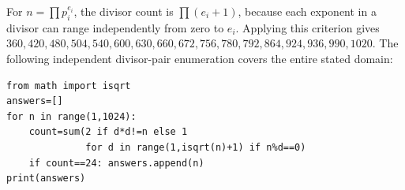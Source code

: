 For $n=\prod p_i^{e_i}$, the divisor count is $\prod(e_i+1)$, because each exponent in a divisor can range independently from zero to $e_i$. Applying this criterion gives $\boxed{360,420,480,504,540,600,630,660,672,756,780,792,864,924,936,990,1020}$. The following independent divisor-pair enumeration covers the entire stated domain:\begin{verbatim}
from math import isqrt
answers=[]
for n in range(1,1024):
    count=sum(2 if d*d!=n else 1
              for d in range(1,isqrt(n)+1) if n%d==0)
    if count==24: answers.append(n)
print(answers)
\end{verbatim}
